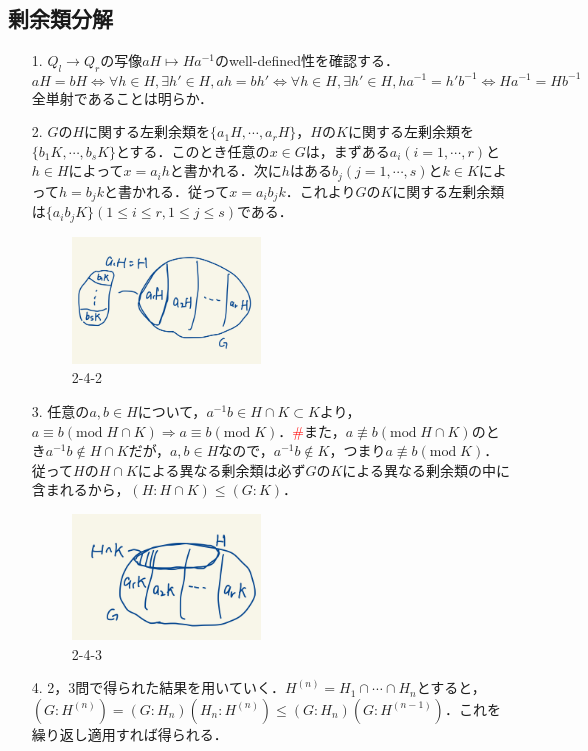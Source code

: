 \documentclass[a4paper,10pt,uplatex]{jsarticle}
\newcommand{\miss}{\textcolor{red}{\#}}
\newcommand{\Mod}{\text{mod}\;}
\numberwithin{equation}{section}
\theoremstyle{mystyle}
\begin{document}
\subsection{剰余類分解}
\begin{itemize}
    \item[1.] $Q_l \to Q_r$の写像$aH \mapsto Ha^{-1}$のwell-defined性を確認する．
    \begin{equation}
        aH = bH \Leftrightarrow \forall h \in H, \exists h' \in H, ah = bh' \Leftrightarrow \forall h \in H, \exists h' \in H, ha^{-1} = h'b^{-1} \Leftrightarrow Ha^{-1} = Hb^{-1}
    \end{equation}
    全単射であることは明らか．

    \item[2.] $G$の$H$に関する左剰余類を$\{a_1H,\cdots,a_rH\}$，$H$の$K$に関する左剰余類を$\{b_1K,\cdots,b_sK\}$とする．このとき任意の$x \in G$は，まずある$a_i(i=1,\cdots,r)$と$h \in H$によって$x = a_ih$と書かれる．次に$h$はある$b_j(j=1,\cdots,s)$と$k \in K$によって$h = b_jk$と書かれる．従って$x = a_ib_jk$．これより$G$の$K$に関する左剰余類は$\{a_ib_jK\}(1 \leq i \leq r,1 \leq j \leq s)$である．
    \begin{figure}[h]
        \centering
        \caption{2-4-2}
        \includegraphics[keepaspectratio,width=50mm]{"2-4-2.jpeg"}
    \end{figure}

    \item[3.] 任意の$a,b \in H$について，$a^{-1}b \in H \cap K \subset K$より，$a \equiv b (\Mod H \cap K) \Rightarrow a \equiv b (\Mod K)$．\miss また，$a \not\equiv b(\Mod H\cap K)$のとき$a^{-1}b \notin H \cap K$だが，$a,b\in H$なので，$a^{-1}b \notin K$，つまり$a \not\equiv b(\Mod K)$．従って$H$の$H \cap K$による異なる剰余類は必ず$G$の$K$による異なる剰余類の中に含まれるから，$(H:H \cap K) \leq (G:K)$．
    \begin{figure}[h]
        \centering
        \caption{2-4-3}
        \includegraphics[keepaspectratio,width=50mm]{"2-4-3.jpeg"}
    \end{figure}

    \item[4.] 2，3問で得られた結果を用いていく．$H^{(n)} = H_1 \cap \cdots \cap H_n$とすると，$(G:H^{(n)}) = (G:H_n)(H_n:H^{(n)}) \leq (G:H_n)(G:H^{(n-1)})$．これを繰り返し適用すれば得られる．
\end{itemize}
\end{document}
